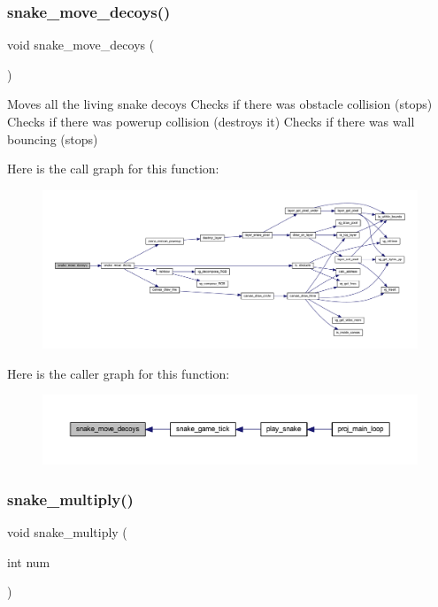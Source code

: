 \subsubsection{\texorpdfstring{snake\+\_\+move\+\_\+decoys()}{snake\_move\_decoys()}}
{\footnotesize\ttfamily void snake\+\_\+move\+\_\+decoys (\begin{DoxyParamCaption}{ }\end{DoxyParamCaption})}



Moves all the living snake decoys Checks if there was obstacle collision (stops) Checks if there was powerup collision (destroys it) Checks if there was wall bouncing (stops) 

Here is the call graph for this function\+:\nopagebreak
\begin{figure}[H]
\begin{center}
\leavevmode
\includegraphics[width=350pt]{group__snake_gae3dcf4434c60729af7c3280262e8c6ad_cgraph}
\end{center}
\end{figure}
Here is the caller graph for this function\+:\nopagebreak
\begin{figure}[H]
\begin{center}
\leavevmode
\includegraphics[width=350pt]{group__snake_gae3dcf4434c60729af7c3280262e8c6ad_icgraph}
\end{center}
\end{figure}
\mbox{\label{group__snake_ga93a5f80b4aa83b0651e9eaa99576140d}} 
\subsubsection{\texorpdfstring{snake\+\_\+multiply()}{snake\_multiply()}}
{\footnotesize\ttfamily void snake\+\_\+multiply (\begin{DoxyParamCaption}\item[{int}]{num }\end{DoxyParamCaption})}



